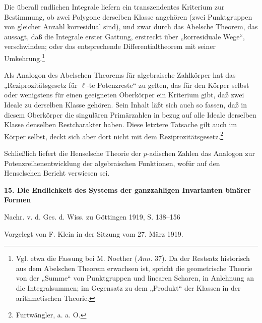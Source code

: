 \documentclass[11pt]{article}
\providecommand{\frS}{\mathfrak S}
\begin{document}
Die überall endlichen Integrale liefern ein transzendentes Kriterium zur Bestimmung, ob zwei Polygone derselben Klasse angehören (zwei Punktgruppen von gleicher Anzahl korresidual sind), und zwar durch das Abelsche Theorem, das aussagt, daß die Integrale erster Gattung, erstreckt über „korresiduale Wege“, verschwinden; oder das entsprechende Differentialtheorem mit seiner Umkehrung.\footnote{Vgl. etwa die Fassung bei M. Noether (\emph{Ann.} 37). Da der Restsatz historisch aus dem Abelschen Theorem erwachsen ist, spricht die geometrische Theorie von der „Summe“ von Punktgruppen und linearen Scharen, in Anlehnung an die Integralsummen; im Gegensatz zu dem „Produkt“ der Klassen in der arithmetischen Theorie.}

Als Analogon des Abelschen Theorems für algebraische Zahlkörper hat das „Reziprozitätsgesetz für \(\ell\)-te Potenzreste“ zu gelten, das für den Körper selbst oder wenigstens für einen geeigneten Oberkörper ein Kriterium gibt, daß zwei Ideale zu derselben Klasse gehören. Sein Inhalt läßt sich auch so fassen, daß in diesem Oberkörper die singulären Primärzahlen in bezug auf alle Ideale derselben Klasse denselben Restcharakter haben. Diese letztere Tatsache gilt auch im Körper selbst, deckt sich aber dort nicht mit dem Reziprozitätsgesetz.\footnote{Furtwängler, a. a. O.}

Schließlich liefert die Henselsche Theorie der \(p\)-adischen Zahlen das Analogon zur Potenzreihenentwicklung der algebraischen Funktionen, wofür auf den Henselschen Bericht verwiesen sei.


\providecommand{\frH}{\mathfrak H}
\providecommand{\frK}{\mathfrak K}
\providecommand{\frM}{\mathfrak M}
\providecommand{\frN}{\mathfrak N}
\providecommand{\frG}{\mathfrak G}
\providecommand{\frS}{\mathfrak S}
\providecommand{\tmod}[1]{\;(\operatorname{mod} #1)}

\clearpage
\begin{center}
{\Large\bfseries 15. Die Endlichkeit des Systems der ganzzahligen Invarianten binärer Formen}\par
\vspace{1em}
Nachr. v. d. Ges. d. Wiss. zu Göttingen 1919, S. 138--156
\end{center}

\vspace{2em}
\begin{center}
Vorgelegt von F. Klein in der Sitzung vom 27. März 1919.
\end{center}
\end{document}
